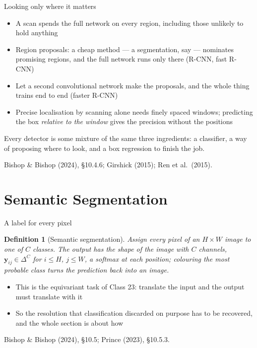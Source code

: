 \documentclass[aspectratio=169, 11pt]{beamer}
\newtheorem{defx}[theorem]{Definition}
\newcommand{\srcline}[1]{%
  \par\vspace{0.25em}%
  {\scriptsize\color{mcMuted}\hfill #1\par}}
\begin{document}
\begin{frame}{Looking only where it matters}
  \vspace{0.1em}
  {\footnotesize
  \begin{itemize}\itemsep0.30em
    \item A scan spends the full network on every region, including
          those unlikely to hold anything
    \item \alert{Region proposals}: a cheap method --- a segmentation,
          say --- nominates promising regions, and the full network runs
          only there (R-CNN, fast R-CNN)
    \item Let a second convolutional network make the proposals, and
          the whole thing trains end to end (faster R-CNN)
    \item Precise localisation by scanning alone needs finely spaced
          windows; predicting the box \emph{relative to the window}
          gives the precision without the positions
  \end{itemize}}
  \vspace{0.3em}
  \begin{redhighlight}
    Every detector is some mixture of the same three ingredients: a
    classifier, a way of proposing where to look, and a box regression
    to finish the job.
  \end{redhighlight}
  \srcline{Bishop \& Bishop (2024), \S10.4.6; Girshick (2015);
  Ren et al.\ (2015).}
\end{frame}

\section{Semantic Segmentation}

\begin{frame}{A label for every pixel}
  \vspace{-0.25em}
  \begin{defx}[Semantic segmentation]\label{th:seg}
    \small
    Assign every pixel of an $H \times W$ image to one of $C$ classes.
    The output has the shape of the image with $C$ channels,
    $\mathbf{y}_{ij} \in \Delta^{C}$ for $i \leq H$, $j \leq W$,
    a softmax at each position; colouring the most probable class turns
    the prediction back into an image.
  \end{defx}
  \vspace{0.0em}
  {\footnotesize
  \begin{itemize}\itemsep0.16em
    \item This is the \alert{equivariant} task of Class 23: translate
          the input and the output must translate with it
    \item So the resolution that classification discarded on purpose
          has to be recovered, and the whole section is about how
  \end{itemize}}
  \srcline{Bishop \& Bishop (2024), \S10.5; Prince (2023), \S10.5.3.}
\end{frame}
\end{document}
